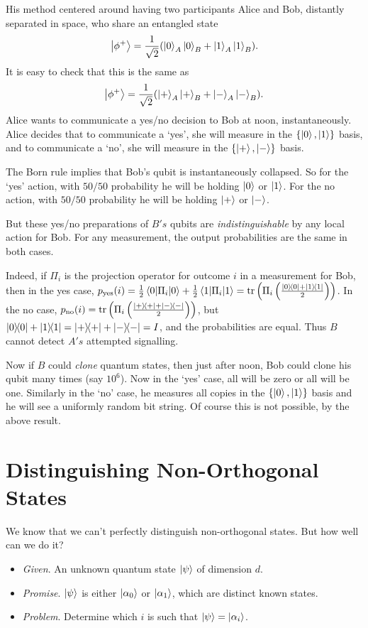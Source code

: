 \documentclass[a4paper]{article}
\begin{document}
	His method centered around having two participants Alice and Bob, distantly separated in space, who share an entangled state
	$$
	\ket{\phi^+} = \frac{1}{\sqrt{2}}(\ket{0}_A \ket{0}_B + \ket{1}_A \ket{1}_B).
	$$
	It is easy to check that this is the same as
	$$
	\ket{\phi^+} = \frac{1}{\sqrt{2}}(\ket{+}_A \ket{+}_B + \ket{-}_A \ket{-}_B).
	$$
	Alice wants to communicate a yes/no decision to Bob at noon, instantaneously. Alice decides that to communicate a `yes', she will measure in the $\{\ket{0}, \ket{1}\}$ basis, and to communicate a `no', she will measure in the $\{\ket{+}, \ket{-}\}$ basis. 

The Born rule implies that Bob's qubit is instantaneously collapsed. So for the `yes' action, with $50/50$ probability he will be holding $\ket{0}$ or $\ket{1}$. For the no action, with $50/50$ probability he will be holding $\ket{+}$ or $\ket{-}$.

But these yes/no preparations of $B's$ qubits are \emph{indistinguishable} by any local action for Bob. 
For any measurement, the output probabilities are the same in both cases.

Indeed, if $\Pi_i$ is the projection operator for outcome $i$ in a measurement for Bob, then in the yes case, $p_{\text{yes}}(i) = \frac{1}{2}\ev{\Pi_i}{0}  +\frac{1}{2}\ev{\Pi_i}{1} = \tr\left(\Pi_i \left(\frac{\op{0}{0} + \op{1}{1}}{2}\right)\right)$. In the no case, $p_{\text{no}}(i) = \tr\left(\Pi_i \left(\frac{\op{+}{+} + \op{-}{-}}{2}\right)\right)$, but $\op{0}{0} + \op{1}{1} = \op{+}{+} + \op{-}{-} = I$, and the probabilities are equal. Thus $B$ cannot detect $A's$ attempted signalling.

Now if $B$ could \emph{clone} quantum states, then just after noon, Bob could clone his qubit many times (say $10^6$). Now in the `yes' case, all will be zero or all will be one. Similarly in the `no' case, he measures all copies in the $\{\ket{0}, \ket{1}\}$ basis and he will see a uniformly random bit string. Of course this is not possible, by the above result.

\section{Distinguishing Non-Orthogonal States}

We know that we can't perfectly distinguish non-orthogonal states. But how well can we do it?

\begin{itemize}
	\item \emph{Given}. An unknown quantum state $\ket{\psi}$ of dimension $d$.
	\item \emph{Promise}. $\ket{\psi}$ is either $\ket{\alpha_0}$ or $\ket{\alpha_1}$, which are distinct known states.
	\item \emph{Problem}. Determine which $i$ is such that $\ket{\psi} = \ket{\alpha_i}$.
\end{itemize}
\end{document}
